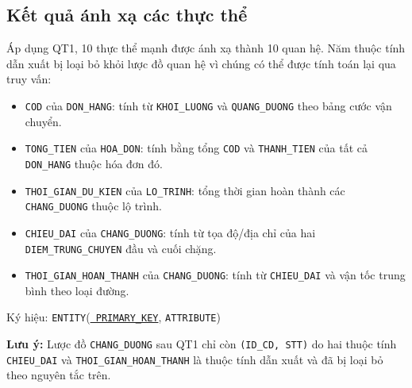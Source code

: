 \documentclass[11pt]{report}
\begin{document}
\subsection{Kết quả ánh xạ các thực thể}
\label{subsec:anhxa_thucthe}

Áp dụng QT1, 10 thực thể mạnh được ánh xạ thành 10 quan hệ. Năm thuộc tính dẫn xuất bị loại bỏ khỏi lược đồ quan hệ vì chúng có thể được tính toán lại qua truy vấn:

\begin{itemize}
    \item \texttt{COD} của \texttt{DON\_HANG}: tính từ \texttt{KHOI\_LUONG} và \texttt{QUANG\_DUONG} theo bảng cước vận chuyển.
    \item \texttt{TONG\_TIEN} của \texttt{HOA\_DON}: tính bằng tổng \texttt{COD} và \texttt{THANH\_TIEN} của tất cả \texttt{DON\_HANG} thuộc hóa đơn đó.
    \item \texttt{THOI\_GIAN\_DU\_KIEN} của \texttt{LO\_TRINH}: tổng thời gian hoàn thành các \texttt{CHANG\_DUONG} thuộc lộ trình.
    \item \texttt{CHIEU\_DAI} của \texttt{CHANG\_DUONG}: tính từ tọa độ/địa chỉ của hai \texttt{DIEM\_TRUNG\_CHUYEN} đầu và cuối chặng.
    \item \texttt{THOI\_GIAN\_HOAN\_THANH} của \texttt{CHANG\_DUONG}: tính từ \texttt{CHIEU\_DAI} và vận tốc trung bình theo loại đường.
\end{itemize}

Ký hiệu: \texttt{ENTITY}(\underline{\texttt{\color{Emerald} PRIMARY\_KEY}}, \texttt{ATTRIBUTE})

\noindent\textbf{Lưu ý:} Lược đồ \texttt{CHANG\_DUONG} sau QT1 chỉ còn \texttt{(ID\_CD, STT)} do hai thuộc tính \texttt{CHIEU\_DAI} và \texttt{THOI\_GIAN\_HOAN\_THANH} là thuộc tính dẫn xuất và đã bị loại bỏ theo nguyên tắc trên.
\end{document}
